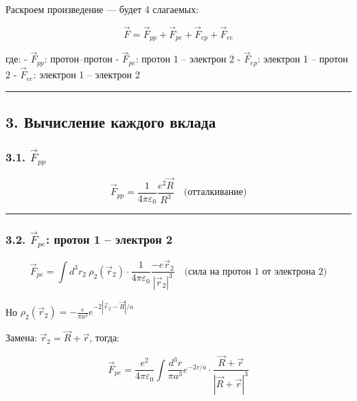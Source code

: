\documentclass[11pt]{article}
\begin{document}
Раскроем произведение --- будет 4 слагаемых:

\[
\vec{F} = \vec{F}_{pp} + \vec{F}_{pe} + \vec{F}_{ep} + \vec{F}_{ee}
\]

где: - \(\vec{F}_{pp}\): протон--протон - \(\vec{F}_{pe}\): протон 1 --
электрон 2 - \(\vec{F}_{ep}\): электрон 1 -- протон 2 -
\(\vec{F}_{ee}\): электрон 1 -- электрон 2

\begin{center}\rule{0.5\linewidth}{\linethickness}\end{center}

\subsection{3. Вычисление каждого
вклада}\label{ux432ux44bux447ux438ux441ux43bux435ux43dux438ux435-ux43aux430ux436ux434ux43eux433ux43e-ux432ux43aux43bux430ux434ux430}

\subsubsection{\texorpdfstring{3.1.
\(\vec{F}_{pp}\)}{3.1. \textbackslash{}vec\{F\}\_\{pp\}}}\label{vecf_pp}

\[
\vec{F}_{pp} = \frac{1}{4\pi\varepsilon_0} \frac{e^2 \vec{R}}{R^3}
\quad \text{(отталкивание)}
\]

\begin{center}\rule{0.5\linewidth}{\linethickness}\end{center}

\subsubsection{\texorpdfstring{3.2. \(\vec{F}_{pe}\): протон 1 --
электрон
2}{3.2. \textbackslash{}vec\{F\}\_\{pe\}: протон 1 -- электрон 2}}\label{vecf_pe-ux43fux440ux43eux442ux43eux43d-1-ux44dux43bux435ux43aux442ux440ux43eux43d-2}

\[
\vec{F}_{pe} = \int d^3r_2\ \rho_2(\vec{r}_2) \cdot \frac{1}{4\pi\varepsilon_0} \frac{ -e \vec{r}_2 }{ |\vec{r}_2|^3 }
\quad \text{(сила на протон 1 от электрона 2)}
\]

Но
\(\rho_2(\vec{r}_2) = -\frac{e}{\pi a^3} e^{-2|\vec{r}_2 - \vec{R}|/a}\)

Замена: \(\vec{r}_2 = \vec{R} + \vec{r}\), тогда:

\[
\vec{F}_{pe} = \frac{e^2}{4\pi\varepsilon_0} \int \frac{d^3r}{\pi a^3} e^{-2r/a} \cdot \frac{ \vec{R} + \vec{r} }{ |\vec{R} + \vec{r}|^3 }
\]
\end{document}
